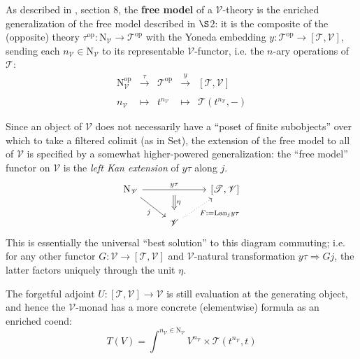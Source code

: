 \documentclass{amsart}
\theoremstyle{definition}
\newcommand{\Set}{\mathrm{Set}}
\newcommand{\op}{\mathrm{op}}
\newcommand{\NN}{\mathrm{N}}
\newcommand{\V}{\mathscr{V}}
\newcommand{\T}{\mathscr{T}}
\newcommand{\maps}{\colon}
\begin{document}
As described in \cite{rbb}, section 8, the \textbf{free model} of a $\V$-theory is the enriched generalization of the free model described in $\S$2: it is the composite of the (opposite) theory $\tau^\op\maps \NN_\V \to \T^\op$ with the Yoneda embedding $y\maps \T^\op \to [\T,\V]$, sending each $n_\V \in \NN_\V$ to its representable $\V$-functor, i.e. the $n$-ary operations of $\T$:
\[\begin{array}{rllll}
\NN_\V^\op & \xrightarrow{\tau} & \T^\op & \xrightarrow{y} & \left[\T,\V\right]\\
\\
n_\V & \mapsto & t^{n_\V} & \mapsto & \T(t^{n_\V},-)
\end{array}\]

Since an object of $\V$ does not necessarily have a ``poset of finite subobjects'' over which to take a filtered colimit (as in $\Set$), the extension of the free model to all of $\V$ is specified by a somewhat higher-powered generalization: the ``free model'' functor on $\V$ is the \textit{left Kan extension} of $y\tau$ along $j$.
\[\begin{tikzcd}
\NN_\V \arrow[rr,"y\tau"{name=y}] \arrow[swap,rd,"j"] & & \left[\T,\V\right]\\
& \V \arrow[swap,dotted, ru,"F:=\mathrm{Lan}_jy\tau"] \arrow[Rightarrow,from=y,"\eta", shorten >=0.2cm,shorten <=.2cm]
\end{tikzcd}\]
This is essentially the universal ``best solution'' to this diagram commuting; i.e. for any other functor $G: \V \to [\T,\V]$ and $\V$-natural transformation $y\tau \Rightarrow Gj$, the latter factors uniquely through the unit $\eta$.

The forgetful adjoint $U\maps [\T,\V] \to \V$ is still evaluation at the generating object, and hence the $\V$-monad has a more concrete (elementwise) formula as an enriched coend:
\begin{equation}
T(V) = \int^{n_\V\in \NN_\V} V^{n_\V} \times \T(t^{n_\V},t)
\end{equation}
\end{document}
